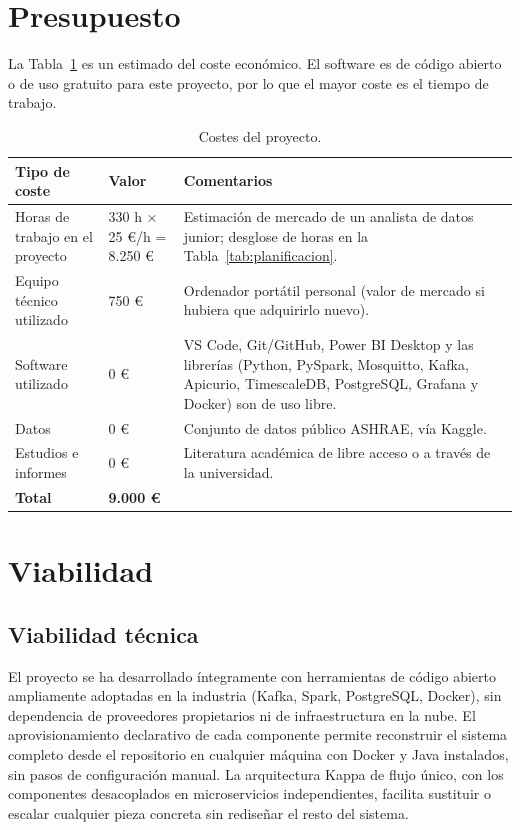 \section{Presupuesto}

La Tabla~\ref{tab:costes} es un estimado del coste económico. El software es de código abierto o de uso gratuito para este proyecto, por lo que el mayor coste es el tiempo de trabajo.

\begin{table}[ht!]
  \centering
  \begin{tabular}{|p{4cm}|p{3cm}|p{6cm}|}
    \hline
    \textbf{Tipo de coste} & \textbf{Valor} & \textbf{Comentarios} \\ \hline
    Horas de trabajo en el proyecto & 330 h × 25 €/h = 8.250 € & Estimación de mercado de un analista de datos junior; desglose de horas en la Tabla~\ref{tab:planificacion}. \\ \hline
    Equipo técnico utilizado & 750 € & Ordenador portátil personal (valor de mercado si hubiera que adquirirlo nuevo). \\ \hline
    Software utilizado & 0 € & VS Code, Git/GitHub, Power BI Desktop y las librerías (Python, PySpark, Mosquitto, Kafka, Apicurio, TimescaleDB, PostgreSQL, Grafana y Docker) son de uso libre. \\ \hline
    Datos & 0 € & Conjunto de datos público ASHRAE, vía Kaggle. \\ \hline
    Estudios e informes & 0 € & Literatura académica de libre acceso o a través de la universidad. \\ \hline
    \textbf{Total} & \textbf{9.000 €} & \\ \hline
  \end{tabular}
  \caption{Costes del proyecto.}
  \label{tab:costes}
\end{table}

\section{Viabilidad}

\subsection{Viabilidad técnica}

El proyecto se ha desarrollado íntegramente con herramientas de código abierto ampliamente adoptadas en la industria (Kafka, Spark, PostgreSQL, Docker), sin dependencia de proveedores propietarios ni de infraestructura en la nube. El aprovisionamiento declarativo de cada componente permite reconstruir el sistema completo desde el repositorio en cualquier máquina con Docker y Java instalados, sin pasos de configuración manual. La arquitectura Kappa de flujo único, con los componentes desacoplados en microservicios independientes, facilita sustituir o escalar cualquier pieza concreta sin rediseñar el resto del sistema.

